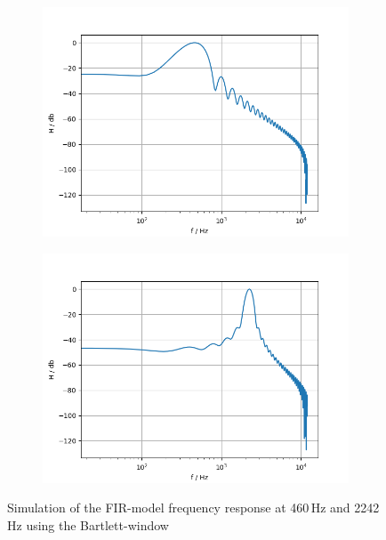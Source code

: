 \begin{figure}[!h]
    \centering
    \begin{subfigure}[c]{0.49\textwidth}
        \centering
        \includegraphics[width=\textwidth]{img/fir_bandpass460_bartlett.png}
    \end{subfigure}
    \begin{subfigure}[c]{0.49\textwidth}
        \centering
        \includegraphics[width=\textwidth]{img/fir_bandpass2242_bartlett.png}
    \end{subfigure}
    \caption{Simulation of the \ac{FIR}-model frequency response at 460\,Hz and 2242\,Hz using the Bartlett-window}
    \label{fig:fir-sim-bartlett}
\end{figure}

